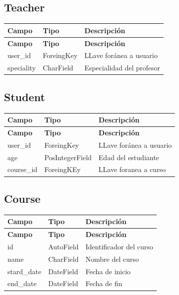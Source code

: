 \documentclass[a4paper,12pt]{article}
\begin{document}
\subsection{Teacher}
\begin{longtable}{| p{3cm} | p{3cm}|p{10cm}|}
	\hline
	\textbf{Campo} & \textbf{Tipo} & \textbf{Descripción} \\
	\hline
	\endfirsthead
	\hline
	\textbf{Campo} & \textbf{Tipo} & \textbf{Descripción} \\
	\hline
	\endhead
	\hline
	\endfoot
	\hline
	\endlastfoot
	
	user\_id & ForeingKey & LLave foránea a usuario \\
	\hline
	speciality & CharField & Especialidad del profesor \\
	
\hline
\end{longtable}

\subsection{Student}
\begin{longtable}{| p{3cm} | p{3cm}|p{10cm}|}
	\hline
	\textbf{Campo} & \textbf{Tipo} & \textbf{Descripción} \\
	\hline
	\endfirsthead
	\hline
	\textbf{Campo} & \textbf{Tipo} & \textbf{Descripción} \\
	\hline
	\endhead
	\hline
	\endfoot
	\hline
	\endlastfoot
	
	user\_id & ForeingKey & LLave foránea a usuario \\
	\hline
	age & PosIntegerField & Edad del estudiante \\
	\hline
	course\_id & ForeingKEy & LLave foranea a curso \\
	\hline
	
	\hline
\end{longtable}

\subsection{Course}
\begin{longtable}{| p{3cm} | p{3cm}|p{10cm}|}
	\hline
	\textbf{Campo} & \textbf{Tipo} & \textbf{Descripción} \\
	\hline
	\endfirsthead
	\hline
	\textbf{Campo} & \textbf{Tipo} & \textbf{Descripción} \\
	\hline
	\endhead
	\hline
	\endfoot
	\hline
	\endlastfoot
	
	id & AutoField & Identificador del curso \\
	\hline
	name & CharField & Nombre del curso \\
	\hline
	stard\_date & DateField & Fecha de inicio\\
	\hline
	end\_date & DateField & Fecha de fin\\
	
	\hline
\end{longtable}
\newpage
\end{document}
